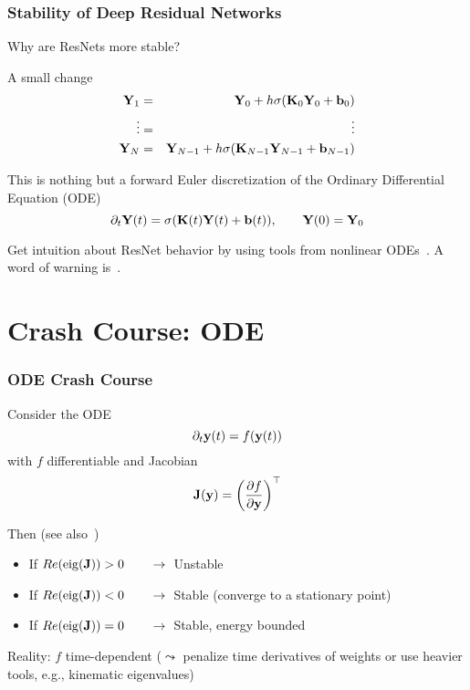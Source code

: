 \documentclass[12pt,fleqn,handout]{beamer}
\begin{document}
\begin{frame}\frametitle{Stability of Deep Residual Networks}

Why are ResNets more stable?

A small change
\begin{eqnarray*}
{\bf Y}_1 &=& {\bf Y}_0 + h \sigma({\bf K}_0 {\bf Y}_0  + {\bf b}_0) \\
\vdots &=& \vdots \\
 {\bf Y}_N &=& {\bf Y}_{N-1} + h\sigma({\bf K}_{N-1} {\bf Y}_{N-1} + {\bf b}_{N-1})
 \end{eqnarray*}

\bigskip
\pause 

This is nothing but a forward Euler discretization
of the  Ordinary Differential Equation (ODE)
$$ \partial_t {\bf Y}(t) = \sigma({\bf K}(t) {\bf Y}(t)  + {\bf b}(t)), \quad \quad {\bf Y}(0) = {\bf Y}_0 $$

Get intuition about ResNet behavior by using tools from nonlinear ODEs~\cite{HaberRuthotto2017,E2017}. A word of warning is~\cite{Ascher2019}.

\end{frame}


\section{Crash Course: ODE} %
\label{sec:crash_course_ode}
\begin{frame}\frametitle{ODE Crash Course}

Consider the ODE
$$ \partial_t {\bf y}(t) = f({\bf y}(t)) $$
with  $f$ differentiable and Jacobian
$$ {\bf J}({\bf y}) = \left({\frac {\partial f}{\partial {\bf y}}}\right)^\top$$


Then (see also~\cite{AscherPetzold1998,AscherGreif2011,Ascher2010})
\begin{itemize}
\item If $Re({\rm eig}({\bf J})) > 0\quad \quad \rightarrow$\ Unstable
\item If $Re({\rm eig}({\bf J})) < 0\quad \quad \rightarrow$\ Stable (converge to a stationary point)
\item If $Re({\rm eig}({\bf J})) = 0\quad \quad \rightarrow$\ Stable, energy bounded
\end{itemize}

Reality: $f$ time-dependent ($\leadsto$ penalize time derivatives of weights or use heavier tools, e.g., kinematic eigenvalues)

\end{frame}
\end{document}
